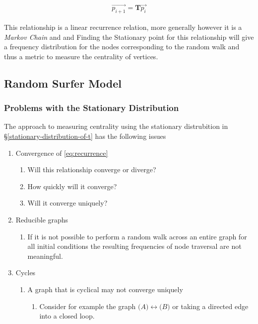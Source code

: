 \documentclass[11pt]{report}
\begin{document}
\begin{align}
\vec{p_{i+1}} = \mathbf{T}\vec{p_{i}} \label{eq:recurrence}
\end{align}

This relationship is a linear recurrence relation, more generally however it is
a \emph{Markov Chain} and \cite[\S 4.4]{langvilleGooglePageRankScience2012} and
Finding the Stationary point for this relationship will give a frequency
distribution for the nodes corresponding to the random walk and thus a metric to
measure the centrality of vertices.

\subsection{Random Surfer Model}
\label{sec:org046df67}
\subsubsection{Problems with the Stationary Distribution}
\label{issues}
The approach to measuring centrality using the stationary distrubition in \S\ref{stationary-distribution-of-t} has the following issues

\begin{enumerate}
\item Convergence of \eqref{eq:recurrence}
\begin{enumerate}
\item Will this relationship converge or diverge?
\item How quickly will it converge?
\item Will it converge uniquely?
\end{enumerate}
\item Reducible graphs
\begin{enumerate}
\item If it is not possible to perform a random walk across an entire graph for
all initial conditions the resulting frequencies of node traversal are not
meaningful.
\end{enumerate}
\item Cycles
\begin{enumerate}
\item A graph that is cyclical may not converge uniquely
\begin{enumerate}
\item Consider for example the graph \({\big (} A {\big )} \longleftrightarrow {\big (} B {\big )}\) or taking a directed edge into a closed loop.
\end{enumerate}
\end{enumerate}
\end{enumerate}
\end{document}
